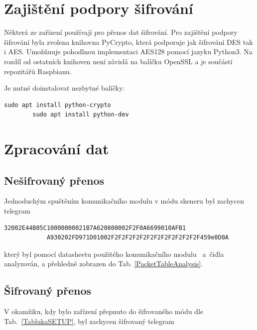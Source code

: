\section{Zajištění podpory šifrování}
Některá ze zařízení používají pro přenos dat šifrování. Pro zajištění podpory šifrování byla zvolena knihovna PyCrypto, která podporuje jak šifrování DES tak i AES. 
Umožňuuje pohodlnou implementaci AES128 pomocí jazyku Python3. Na rozdíl od ostatních knihoven není závislá na balíčku OpenSSL a je součástí repozitářů Raspbianu. 

Je nutné doinstalovat nezbytné balíčky:	
 
\begin{lstlisting}[style=MyCodeBash]
		sudo apt install python-crypto
		sudo apt install python-dev
	\end{lstlisting}
	\vspace{-20pt}


\section{Zpracování dat}

\subsection{Nešifrovaný přenos}

Jednoduchým spuštěním komunikačního modulu v módu skeneru byl zachycen telegram

\begin{lstlisting}[style=MyCodePHP]
			32002E44B05C10000000021B7A620800002F2F0A6699010AFB1
			A930202FD971D01002F2F2F2F2F2F2F2F2F2F2F2F2F459e0D0A
\end{lstlisting}

který byl pomocí datasheetu použitého komunikačního modulu~\cite{ModulIQRF} a~čidla~\cite{CidloWeptech} analyzován, a přehledně zobrazen do Tab. \ref{PacketTableAnalysis}.

\subsection{Šifrovaný přenos}

V okamžiku, kdy bylo zařízení přepnuto do šifrovaného módu dle Tab.~\ref{TablukaSETUP}, byl zachycen šifrovaný telegram


